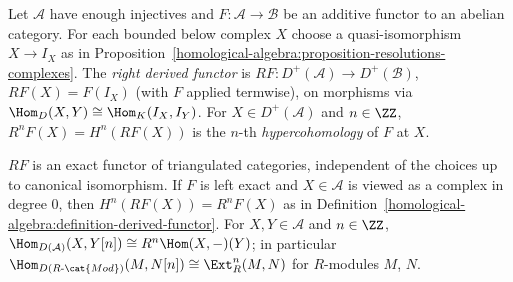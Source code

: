 \begin{definition}\label{homological-algebra:definition-right-derived}
Let $\mathcal{A}$ have enough injectives and $F \colon \mathcal{A} \to \mathcal{B}$ be an additive functor to an abelian category. For each bounded
below complex $X$ choose a quasi-isomorphism $X \to I_X$ as in Proposition~\ref{homological-algebra:proposition-resolutions-complexes}. The
\emph{right derived functor} is $RF \colon D^+(\mathcal{A}) \to D^+(\mathcal{B})$, $RF(X) = F(I_X)$ (with $F$ applied termwise), on morphisms via
$\Hom_{D}(X, Y) \cong \Hom_K(I_X, I_Y)$. For $X \in D^+(\mathcal{A})$ and $n \in \ZZ$, $R^nF(X) = H^n(RF(X))$ is the $n$-th \emph{hypercohomology}
of $F$ at $X$.
\end{definition}

\begin{proposition}\label{homological-algebra:proposition-derived-functor-properties}
$RF$ is an exact functor of triangulated categories, independent of the choices up to canonical isomorphism. If $F$ is left exact and
$X \in \mathcal{A}$ is viewed as a complex in degree $0$, then $H^n(RF(X)) = R^nF(X)$ as in
Definition~\ref{homological-algebra:definition-derived-functor}. For $X, Y \in \mathcal{A}$ and $n \in \ZZ$,
$\Hom_{D(\mathcal{A})}(X, Y[n]) \cong R^n\Hom(X, -)(Y)$; in particular $\Hom_{D(R\text{-}\cat{Mod})}(M, N[n]) \cong \Ext^n_R(M, N)$ for
$R$-modules $M$, $N$.
\end{proposition}

